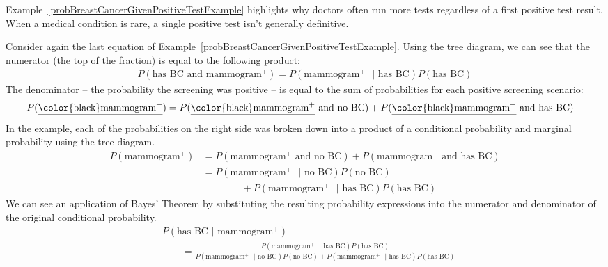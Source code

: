 
\D{\newpage}

Example~\ref{probBreastCancerGivenPositiveTestExample} highlights why doctors often run more tests regardless of a first positive test result. When a medical condition is rare, a single positive test isn't generally definitive.

Consider again the last equation of Example~\ref{probBreastCancerGivenPositiveTestExample}.
Using the tree diagram, we can see that the numerator (the top of the fraction) is equal to the following product:
\begin{align*}
P(\text{has BC and mammogram$^+$}) = P(\text{mammogram$^+$ } | \text{ has BC})P(\text{has BC})
\end{align*}
The denominator -- the probability the screening was positive -- is equal to the sum of probabilities for each positive screening scenario:
\begin{align*}
P(\text{\underline{\color{black}mammogram$^+$}})
	&= P(\text{\underline{\color{black}mammogram$^+$} and no BC})
		+ P(\text{\underline{\color{black}mammogram$^+$} and has BC})
\end{align*}
In the example, each of the probabilities on the right side was broken down into a product of a conditional probability and marginal probability using the tree diagram.
\begin{align*}
P(\text{mammogram$^+$})
	&= P(\text{mammogram$^+$ and no BC}) + P(\text{mammogram$^+$ and has BC}) \\
	&= P(\text{mammogram$^+$ } | \text{ no BC})P(\text{no BC}) \\
			   &\qquad\qquad + P(\text{mammogram$^+$ } | \text{ has BC})P(\text{has BC})
\end{align*}
We can see an application of Bayes' Theorem by substituting the resulting probability expressions into the numerator and denominator of the original conditional probability.
\begin{align*}
& P(\text{has BC } | \text{ mammogram$^+$})  \\
& \qquad= \frac{P(\text{mammogram$^+$ } | \text{ has BC})P(\text{has BC})}
	{P(\text{mammogram$^+$ } | \text{ no BC})P(\text{no BC}) + P(\text{mammogram$^+$ } | \text{ has BC})P(\text{has BC})}
\end{align*}

